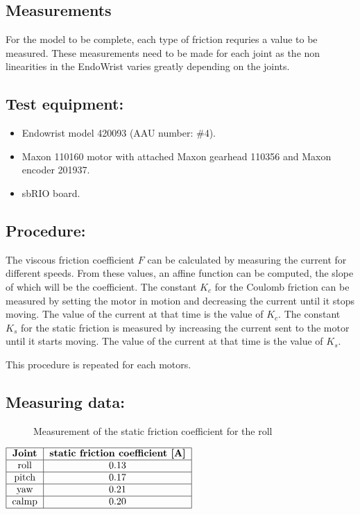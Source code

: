 \subsection{Measurements}

For the model to be complete, each type of friction requries a value to be measured. These measurements need to be made for each joint as the non linearities in the EndoWrist varies greatly depending on the joints.

\subsection*{Test equipment:}

\begin{itemize}
	\item Endowrist model 420093 (AAU number: \#4).
	\item Maxon 110160 motor with attached Maxon gearhead 110356 and Maxon encoder 201937.
	\item sbRIO board.
\end{itemize}

\subsection*{Procedure:}
The viscous friction coefficient $F$ can be calculated by measuring the current for different speeds. From these values, an affine function can be computed, the slope of which will be the coefficient.
The constant $K_c$ for the Coulomb friction can be measured by setting the motor in motion and decreasing the current until it stops moving. The value of the current at that time is the value of $K_c$.
The constant $K_s$ for the static friction is measured by increasing the current sent to the motor until it starts moving. The value of the current at that time is the value of $K_s$.

This procedure is repeated for each motors.

\subsection*{Measuring data:}
\begin{figure}[H]
	\centering
	
	\caption{Measurement of the static friction coefficient for the roll}
	\label{fig:friction_measurement}
\end{figure}

\begin{center}
  $\begin{tabular}{|c|c|}
    \hline
    \textbf{Joint} & \textbf{static friction coefficient [A]} \\
    \hline
    roll & 0.13 \\
    \hline
    pitch & 0.17  \\
    \hline
    yaw & 0.21  \\
    \hline
    calmp & 0.20\\
    \hline
  \end{tabular}$
	\label{fig:static_friction_coefficient}
\end{center}
